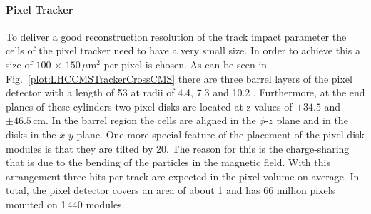 \paragraph*{Pixel Tracker}
To deliver a good reconstruction resolution of the track impact parameter the cells of the pixel tracker need to have a very small size. In order to achieve this a size of $\text{100}\,\times\,\text{150}\,\mu\text{m}^{\text{2}}$ per pixel is chosen. As can be seen in Fig.~\ref{plot:LHCCMSTrackerCrossCMS} there are three barrel layers of the pixel detector with a length of 53\cm{} at radii of 4.4, 7.3 and 10.2 \cm{}. Furthermore, at the end planes of these cylinders two pixel disks are located at z values of $\pm{}34.5$ and $\pm{}46.5\,\text{cm}$. In the barrel region the cells are aligned in the $\phi{}$-$z$ plane and in the disks in the $x$-$y$ plane. One more special feature of the placement of the pixel disk modules is that they are tilted by 20\de{}. The reason for this is the charge-sharing that is due to the bending of the particles in the magnetic field.  With this arrangement three hits per track are expected in the pixel volume on average. In total, the pixel detector covers an area of about 1\ms{} and has 66 million pixels mounted on 1\,440 modules.


